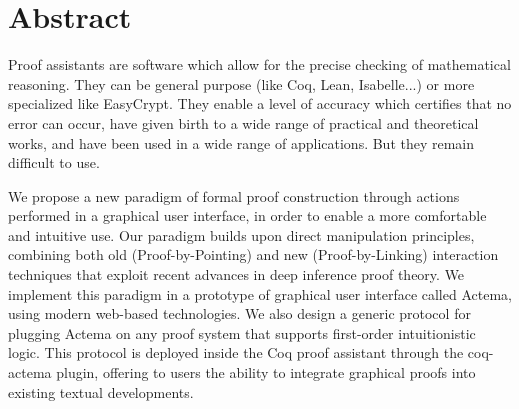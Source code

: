 \dedication{
	The ultimate meaning of logic is this ability to manipulate.
	\flushright -- Jean-Yves Girard.
}



\maketitle


\chapter*{Abstract}

Proof assistants are software which allow for the precise checking of
mathematical reasoning. They can be general purpose (like Coq, Lean,
Isabelle...) or more specialized like EasyCrypt. They enable a level of accuracy
which certifies that no error can occur, have given birth to a wide range of
practical and theoretical works, and have been used in a wide range of
applications. But they remain difficult to use.

We propose a new paradigm of formal proof construction through actions performed
in a graphical user interface, in order to enable a more comfortable and
intuitive use. Our paradigm builds upon direct manipulation principles,
combining both old (Proof-by-Pointing) and new (Proof-by-Linking) interaction
techniques that exploit recent advances in deep inference proof theory. We
implement this paradigm in a prototype of graphical user interface called
Actema, using modern web-based technologies. We also design a generic protocol
for plugging Actema on any proof system that supports first-order intuitionistic
logic. This protocol is deployed inside the Coq proof assistant through the
coq-actema plugin, offering to users the ability to integrate graphical proofs
into existing textual developments.

